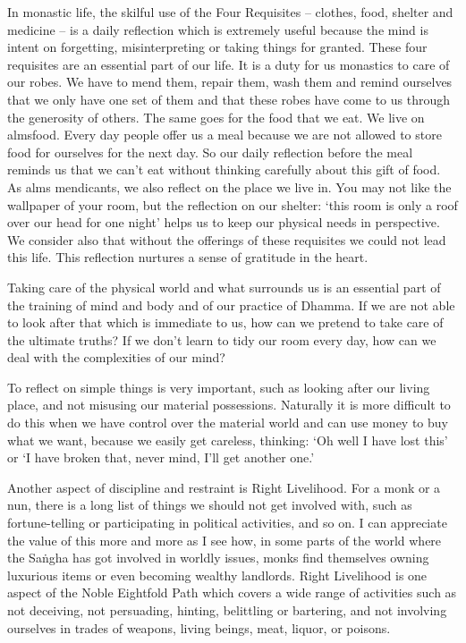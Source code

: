 In monastic life, the skilful use of the Four Requisites -- clothes, food, shelter and medicine -- is a daily reflection which is extremely useful because the mind is intent on forgetting, misinterpreting or taking things for granted. These four requisites are an essential part of our life. It is a duty for us monastics to care of our robes. We have to mend them, repair them, wash them and remind ourselves that we only have one set of them and that these robes have come to us through the generosity of others. The same goes for the food that we eat. We live on almsfood. Every day people offer us a meal because we are not allowed to store food for ourselves for the next day. So our daily reflection before the meal reminds us that we can't eat without thinking carefully about this gift of food. As alms mendicants, we also reflect on the place we live in. You may not like the wallpaper of your room, but the reflection on our shelter: `this room is only a roof over our head for one night' helps us to keep our physical needs in perspective. We consider also that without the offerings of these requisites we could not lead this life. This reflection nurtures a sense of gratitude in the heart.

Taking care of the physical world and what surrounds us is an essential part of the training of mind and body and of our practice of Dhamma. If we are not able to look after that which is immediate to us, how can we pretend to take care of the ultimate truths? If we don't learn to tidy our room every day, how can we deal with the complexities of our mind?

To reflect on simple things is very important, such as looking after our living place, and not misusing our material possessions. Naturally it is more difficult to do this when we have control over the material world and can use money to buy what we want, because we easily get careless, thinking: `Oh well I have lost this' or `I have broken that, never mind, I'll get another one.'

Another aspect of discipline and restraint is Right Livelihood. For a monk or a nun, there is a long list of things we should not get involved with, such as fortune-telling or participating in political activities, and so on. I can appreciate the value of this more and more as I see how, in some parts of the world where the Sa\.ngha has got involved in worldly issues, monks find themselves owning luxurious items or even becoming wealthy landlords. Right Livelihood is one aspect of the Noble Eightfold Path which covers a wide range of activities such as not deceiving, not persuading, hinting, belittling or bartering, and not involving ourselves in trades of weapons, living beings, meat, liquor, or poisons.

